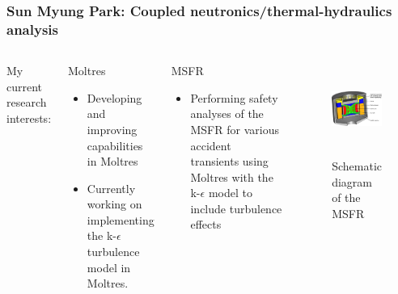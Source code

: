\begin{frame}
	\frametitle{Sun Myung Park: Coupled neutronics/thermal-hydraulics analysis}
		\begin{columns}
		\column[t]{6cm}
		My current research interests:
		\begin{block}{Moltres}
			\begin{itemize}
				\item Developing and improving capabilities in Moltres \\
				\item Currently working on
				implementing the k-$\epsilon$ turbulence model in Moltres.
			\end{itemize}
		\end{block}
		\begin{block}{\gls{MSFR}}
			\begin{itemize}
			\item Performing safety analyses of the \gls{MSFR} for various
			accident transients using Moltres with the k-$\epsilon$ model to
			include turbulence effects
			\end{itemize}
		\end{block}
		\column[t]{4cm}
		\begin{figure}[htbp!]
			\begin{center}
				\includegraphics[height=3cm]{./images/msfr}
			\end{center}
			\caption{Schematic diagram of the \gls{MSFR}}
			\label{fig:msfr}
		\end{figure}
		\end{columns}
\end{frame}

